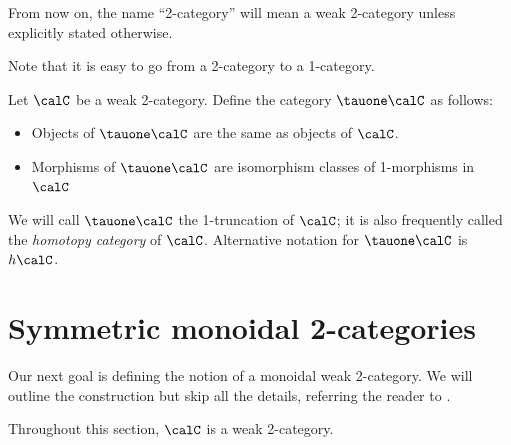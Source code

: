 \begin{convention}
  From now on, the name ``2-category'' will mean a weak 2-category unless
  explicitly stated otherwise.
\end{convention}
Note that it is easy to go from a 2-category to a 1-category.
\begin{definition}\label{d:hC}
  Let $\calC$ be a weak 2-category. Define the category $\tauone\calC$
  as follows:
  \begin{itemize}
    \item Objects of $\tauone\calC$ are the same as objects of $\calC$.
    \item Morphisms of $\tauone\calC$ are isomorphism classes of 1-morphisms in
    $\calC$
  \end{itemize}
  We will call $\tauone\calC$ the 1-truncation of $\calC$; it is also frequently
  called the  \emph{homotopy category} of $\calC$.
  Alternative notation for $\tauone\calC$ is $h\calC$.
\end{definition}

\section{Symmetric monoidal 2-categories}\label{s:sym-mon-2cat}


Our next goal is defining the notion of a monoidal weak 2-category. We will
outline the construction but skip all the details, referring the reader to
\cite[Appendix C]{schommer-pries}.

Throughout this section, $\calC$ is a weak 2-category.

